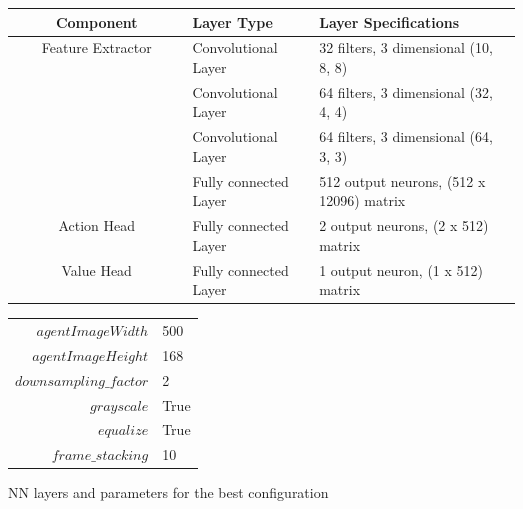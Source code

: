 \begin{figure}
    \begin{center}
        \begin{tabular}{|| c | p{0.25\linewidth} | p{0.4\linewidth} ||}
            \hline
            Component                          & Layer Type            & Layer Specifications                     \\ [0.5ex]
            \hline\hline
            \multirow{4}{*}{Feature Extractor} & Convolutional Layer   & 32 filters, 3 dimensional (10, 8, 8)     \\\cline{2-3}
                                               & Convolutional Layer   & 64 filters, 3 dimensional (32, 4, 4)     \\\cline{2-3}
                                               & Convolutional Layer   & 64 filters, 3 dimensional (64, 3, 3)     \\\cline{2-3}
                                               & Fully connected Layer & 512 output neurons, (512 x 12096) matrix \\
            \hline
            Action Head                        & Fully connected Layer & 2 output neurons, (2 x 512) matrix       \\
            \hline
            Value Head                         & Fully connected Layer & 1 output neuron, (1 x 512) matrix        \\
            \hline
        \end{tabular}
        \begin{tabular}{r@{: }l}
            $agentImageWidth$      & 500  \\
            $agentImageHeight$     & 168  \\
            $downsampling\_factor$ & 2    \\
            $grayscale$            & True \\
            $equalize$             & True \\
            $frame\_stacking$      & 10   \\
        \end{tabular}
    \end{center}
    \caption{\ac{NN} layers and parameters for the best configuration}
    \label{fig:network_architecture}
\end{figure}

